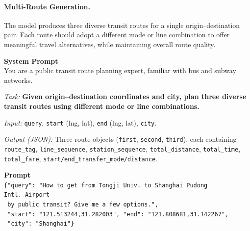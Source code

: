 \documentclass{llmxive}
\begin{document}
\paragraph{Multi-Route Generation.}
The model produces three diverse transit routes for a single origin--destination pair. Each route should adopt a different mode or line combination to offer meaningful travel alternatives, while maintaining overall route quality.
\begin{tcolorbox}[colback=gray!3, colframe=black!40, boxrule=0.4pt, arc=2pt, left=6pt, right=6pt, top=4pt, bottom=4pt, fontupper=\small, fontlower=\small, breakable, title={\small\textbf{Prompt \& Label}}]
\textbf{System Prompt} \\[2pt]
You are a public transit route planning expert, familiar with bus and subway networks.

\textit{Task:} \textbf{Given origin--destination coordinates and city, plan three diverse transit routes using different mode or line combinations.}

\textit{Input:} \texttt{query}, \texttt{start} (lng, lat), \texttt{end} (lng, lat), \texttt{city}.

\textit{Output (JSON):} Three route objects (\texttt{first}, \texttt{second}, \texttt{third}), each containing \texttt{route\_tag}, \texttt{line\_sequence}, \texttt{station\_sequence}, \texttt{total\_distance}, \texttt{total\_time}, \texttt{total\_fare}, \texttt{start/end\_transfer\_mode/distance}.

\tcblower

\textbf{Prompt} \\[2pt]
\texttt{\{"query": "How to get from Tongji Univ.\ to Shanghai Pudong Intl.\ Airport} \\
\texttt{~by public transit? Give me a few options.",} \\
\texttt{~"start": "121.513244,31.282003", "end": "121.808681,31.142267",} \\
\texttt{~"city": "Shanghai"\}}


\end{tcolorbox}
\end{document}
